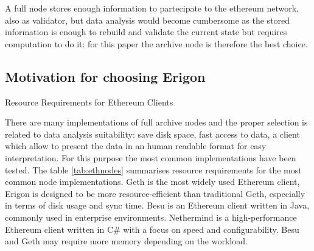 \documentclass[11pt,a4paper,titlepage]{scrartcl}
\begin{document}
A full node stores enough information to partecipate to the ethereum network, also as validator, but data analysis would become cumbersome as the stored information is enough to rebuild and validate the current state but requires computation to do it: for this paper the archive node is therefore the best choice. 


\subsection {Motivation for choosing Erigon}


\begin{table}[H] %
\centering
\caption{Resource Requirements for Ethereum Clients}
\captionsetup{font=footnotesize, justification=centering}
\caption*{\footnotesize This table lists the resource requirements for different Ethereum clients, including disk and RAM usage, and CPU demands for full and archive nodes.}
\label{tab:ethnodes}
\end{table}

There are many implementations of full archive nodes and the proper selection is related to  data analysis suitability: save disk space, fast access to data, a client which allow to present the data in an human readable format for easy interpretation. For this purpose  the most common implementations have been tested. The table  \ref{tab:ethnodes} summarises resource requirements for the most common node implementations. 
Geth is the most widely used Ethereum client, Erigon is designed to be more resource-efficient than traditional Geth, especially in terms of disk usage and sync time.
Besu is an Ethereum client written in Java, commonly used in enterprise environments.
Nethermind is a high-performance Ethereum client written in C\# with a focus on speed and configurability.
Besu and Geth may require more memory depending on the workload.
\end{document}
